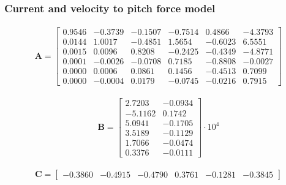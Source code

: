 \subsubsection{Current and velocity to pitch force model}
\begin{align}
\mathbf{A} = \begin{bmatrix}
    0.9546   &-0.3739   &-0.1507   &-0.7514    &0.4866   &-4.3793\\
    0.0144    &1.0017   &-0.4851    &1.5654   &-0.6023    &6.5551\\
    0.0015    &0.0096    &0.8208   &-0.2425   &-0.4349   &-4.8771\\
    0.0001   &-0.0026   &-0.0708    &0.7185   &-0.8808   &-0.0027\\
    0.0000    &0.0006    &0.0861    &0.1456   &-0.4513    &0.7099\\
    0.0000   &-0.0004    &0.0179   &-0.0745   &-0.0216    &0.7915
     \end{bmatrix}
\end{align}

\begin{align}
\mathbf{B} = \begin{bmatrix}
    2.7203   &-0.0934\\
   -5.1162    &0.1742\\
    5.0941   &-0.1705\\
    3.5189   &-0.1129\\
    1.7066   &-0.0474\\
    0.3376   &-0.0111
     \end{bmatrix} \cdot 10^{4}
\end{align}

\begin{align}
\mathbf{C} = \begin{bmatrix}
    -0.3860   &-0.4915  & -0.4790    &0.3761   &-0.1281   &-0.3845
\end{bmatrix}
\end{align}